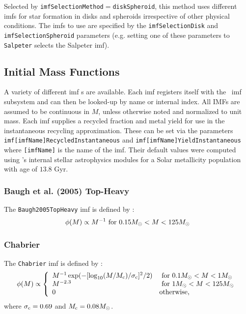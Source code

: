Selected by {\tt imfSelectionMethod}$=${\tt diskSpheroid}, this method uses different {\gls{imf}}s for star formation in disks and spheroids irrespective of other physical conditions. The {\gls{imf}}s to use are specified by the {\tt imfSelectionDisk} and {\tt imfSelectionSpheroid} parameters (e.g. setting one of these parameters to {\tt Salpeter} selects the Salpeter \gls{imf}).

\subsection{Initial Mass Functions}\label{sec:physicsIMF}

A variety of different \gls{imf} s are available. Each \gls{imf} registers itself with the \glc\ \gls{imf} subsystem and can then be looked-up by name or internal index. All IMFs are assumed to be continuous in $M$, unless otherwise noted and normalized to unit mass. Each \gls{imf} supplies a recycled fraction and metal yield for use in the instantaneous recycling approximation. These can be set via the parameters {\tt imf[imfName]RecycledInstantaneous} and {\tt imf[imfName]YieldInstantaneous} where {\tt [imfName]} is the name of the \gls{imf}. Their default values were computed using \glc 's internal stellar astrophysics modules for a Solar metallicity population with age of $13.8$ Gyr.

\subsubsection{Baugh et al. (2005) Top-Heavy}

The {\tt Baugh2005TopHeavy} \gls{imf} is defined by \citep{baugh_can_2005}:
\begin{equation}
 \phi(M) \propto 
 M^{-1} \hbox{ for } 0.15M_\odot < M < 125M_\odot
\end{equation}

\subsubsection{Chabrier}

The {\tt Chabrier} \gls{imf} is defined by \citep{chabrier_galactic_2001}:
\begin{equation}
 \phi(M) \propto \left\{ \begin{array}{ll}
 M^{-1} \exp(-[\log_{10}(M/M_{\rm c})/\sigma_{\rm c}]^2/2) & \hbox{ for } 0.1M_\odot < M < 1M_\odot \\
 M^{-2.3} & \hbox{ for } 1M_\odot < M < 125M_\odot \\
 0 & \hbox {otherwise,} \end{array} \right.
\end{equation}
where $\sigma_{\rm c}=0.69$ and $M_{\rm c}=0.08M_\odot$.

